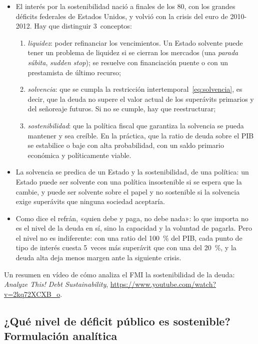 \documentclass[11pt]{article}
\begin{document}
\begin{itemize}
\item El interés por la sostenibilidad nació a finales de los 80, con los grandes déficits federales de Estados Unidos, y volvió con la crisis del euro de 2010-2012. Hay que distinguir 3~conceptos:
  \begin{enumerate}
  \item \emph{liquidez}: poder refinanciar los vencimientos. Un Estado solvente puede tener un problema de liquidez si se cierran los mercados (una \emph{parada súbita}, \emph{sudden stop}); se resuelve con financiación puente o con un prestamista de último recurso;
  \item \emph{solvencia}: que se cumpla la restricción intertemporal~\eqref{eq:solvencia}, es decir, que la deuda no supere el valor actual de los superávits primarios y del señoreaje futuros. Si no se cumple, hay que reestructurar;
  \item \emph{sostenibilidad}: que la política fiscal que garantiza la solvencia se pueda mantener y sea creíble. En la práctica, que la ratio de deuda sobre el PIB se estabilice o baje con alta probabilidad, con un saldo primario económica y políticamente viable\nocite{FMI2021DSA}.
  \end{enumerate}
\item La solvencia se predica de un Estado y la sostenibilidad, de una política: un Estado puede ser solvente con una política insostenible si se espera que la cambie, y puede ser solvente sobre el papel y no sostenible si la solvencia exige superávits que ninguna sociedad aceptaría.
\item Como dice el refrán, «quien debe y paga, no debe nada»: lo que importa no es el nivel de la deuda en sí, sino la capacidad y la voluntad de pagarla. Pero el nivel no es indiferente: con una ratio del 100~\% del PIB, cada punto de tipo de interés cuesta 5~veces más superávit que con una del 20~\%, y la deuda alta deja menos margen ante la siguiente crisis.
\end{itemize}

\begin{anotaciones}
Un resumen en vídeo de cómo analiza el FMI la sostenibilidad de la deuda: \emph{Analyze This! Debt Sustainability}, \url{https://www.youtube.com/watch?v=2kq72XCXB_o}\nocite{FMIAnalyzeThisDebt}.
\end{anotaciones}

\subsection{¿Qué nivel de déficit público es sostenible? Formulación analítica}\label{sec:formulacion-analitica}
\end{document}
